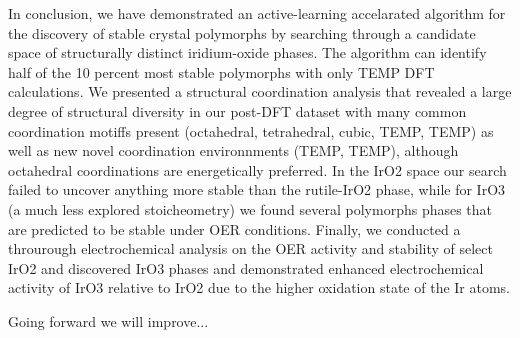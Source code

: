 

%
In conclusion, we have demonstrated an active-learning accelarated algorithm for the discovery of stable crystal polymorphs by searching through a candidate space of structurally distinct iridium-oxide phases.
The algorithm can identify half of the 10 percent most stable polymorphs with only TEMP DFT calculations.
%
We presented a structural coordination analysis that revealed a large degree of structural diversity in our post-DFT dataset with many common coordination motiffs present (octahedral, tetrahedral, cubic, TEMP, TEMP) as well as new novel coordination environnments (TEMP, TEMP),
although octahedral coordinations are energetically preferred.
%
In the IrO2 space our search failed to uncover anything more stable than the rutile-IrO2 phase,
while for IrO3 (a much less explored stoicheometry) we found several polymorphs phases that are predicted to be stable under OER conditions.
%
Finally, we conducted a throurough electrochemical analysis on the OER activity and stability of select IrO2 and discovered IrO3 phases and demonstrated enhanced electrochemical activity of IrO3 relative to IrO2 due to the higher oxidation state of the Ir atoms.


Going forward we will improve...


